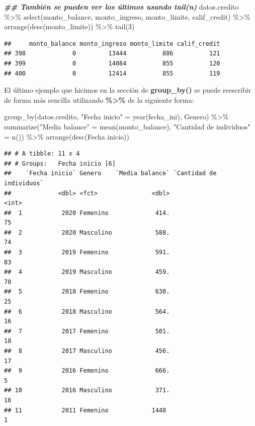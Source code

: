 \documentclass[
  12pt,
]{book}
\newenvironment{Shaded}{\begin{snugshade}}{\end{snugshade}}
\newcommand{\AttributeTok}[1]{\textcolor[rgb]{0.77,0.63,0.00}{#1}}
\newcommand{\DecValTok}[1]{\textcolor[rgb]{0.00,0.00,0.81}{#1}}
\newcommand{\DocumentationTok}[1]{\textcolor[rgb]{0.56,0.35,0.01}{\textbf{\textit{#1}}}}
\newcommand{\FunctionTok}[1]{\textcolor[rgb]{0.00,0.00,0.00}{#1}}
\newcommand{\NormalTok}[1]{#1}
\newcommand{\OtherTok}[1]{\textcolor[rgb]{0.56,0.35,0.01}{#1}}
\newcommand{\SpecialCharTok}[1]{\textcolor[rgb]{0.00,0.00,0.00}{#1}}
\newcommand{\StringTok}[1]{\textcolor[rgb]{0.31,0.60,0.02}{#1}}
\begin{document}
\begin{Shaded}
\begin{Highlighting}[]
\DocumentationTok{\#\# También se pueden ver los últimos usando tail(n)}
\NormalTok{datos.credito }\SpecialCharTok{\%\textgreater{}\%} \FunctionTok{select}\NormalTok{(monto\_balance, monto\_ingreso, monto\_limite, calif\_credit)  }\SpecialCharTok{\%\textgreater{}\%} \FunctionTok{arrange}\NormalTok{(}\FunctionTok{desc}\NormalTok{(monto\_limite)) }\SpecialCharTok{\%\textgreater{}\%} \FunctionTok{tail}\NormalTok{(}\DecValTok{3}\NormalTok{)}
\end{Highlighting}
\end{Shaded}

\begin{verbatim}
##     monto_balance monto_ingreso monto_limite calif_credit
## 398             0         13444          886          121
## 399             0         14084          855          120
## 400             0         12414          855          119
\end{verbatim}

El último ejemplo que hicimos en la sección de \textbf{group\_by()} se puede reescribir de forma más sencilla utilizando \textbf{\%\textgreater\%} de la siguiente forma:

\begin{Shaded}
\begin{Highlighting}[]
\FunctionTok{group\_by}\NormalTok{(datos.credito, }\StringTok{"Fecha inicio"} \OtherTok{=} \FunctionTok{year}\NormalTok{(fecha\_ini), Genero) }\SpecialCharTok{\%\textgreater{}\%} \FunctionTok{summarize}\NormalTok{(}\StringTok{"Media balance"} \OtherTok{=} \FunctionTok{mean}\NormalTok{(monto\_balance), }\StringTok{"Cantidad de individuos"} \OtherTok{=} \FunctionTok{n}\NormalTok{()) }\SpecialCharTok{\%\textgreater{}\%} \FunctionTok{arrange}\NormalTok{(}\FunctionTok{desc}\NormalTok{(}\StringTok{\textasciigrave{}}\AttributeTok{Fecha inicio}\StringTok{\textasciigrave{}}\NormalTok{))}
\end{Highlighting}
\end{Shaded}

\begin{verbatim}
## # A tibble: 11 x 4
## # Groups:   Fecha inicio [6]
##    `Fecha inicio` Genero    `Media balance` `Cantidad de individuos`
##             <dbl> <fct>               <dbl>                    <int>
##  1           2020 Femenino             414.                       75
##  2           2020 Masculino            588.                       74
##  3           2019 Femenino             591.                       83
##  4           2019 Masculino            459.                       70
##  5           2018 Femenino             630.                       25
##  6           2018 Masculino            564.                       16
##  7           2017 Femenino             501.                       18
##  8           2017 Masculino            456.                       17
##  9           2016 Femenino             666.                        5
## 10           2016 Masculino            371.                       16
## 11           2011 Femenino            1448                         1
\end{verbatim}
\end{document}
